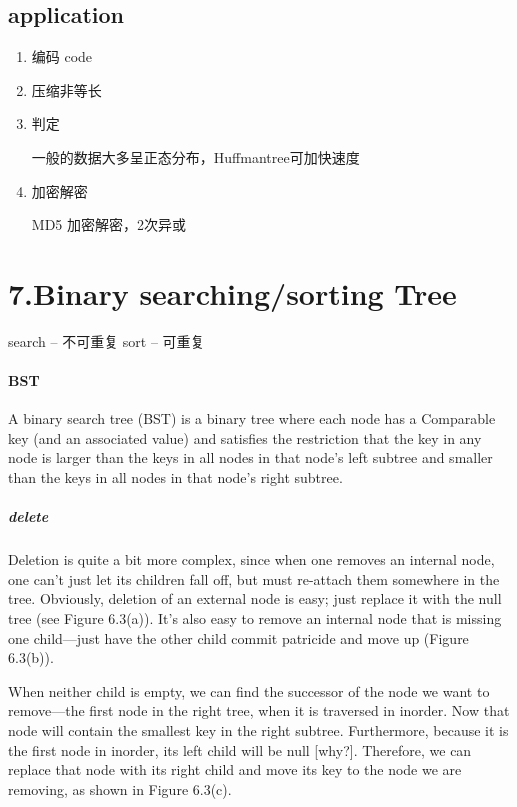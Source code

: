 \documentclass[UTF8]{ctexart}
\begin{document}
\subsection*{application}
\begin{enumerate}
\item 编码 code
\item 压缩非等长
\item 判定

一般的数据大多呈正态分布，Huffmantree可加快速度
\item 加密解密 

MD5 加密解密，2次异或
\end{enumerate}

\newpage
\section*{7.Binary searching/sorting Tree }
search -- 不可重复
sort -- 可重复
\paragraph{BST}
A binary search tree (BST) is a binary tree where each node has a Comparable key (and an associated value) 
and satisfies the restriction that the key in any node is 
larger than the keys in all nodes in that node's left subtree 
and smaller than the keys in all nodes in that node's right subtree.

\subparagraph{delete}
Deletion is quite a bit more complex, since when one removes an internal node, 
one can’t just let its children fall off, but must re-attach them somewhere in the tree. 
Obviously, deletion of an external node is easy; 
just replace it with the null tree (see Figure 6.3(a)). 
It’s also easy to remove an internal node that 
is missing one child—just have the other child commit patricide and move up (Figure 6.3(b)). 

When neither child is empty, we can find the successor of the node we want 
to remove—the first node in the right tree, when it is traversed in inorder. 
Now that node will contain the smallest key in the right subtree. 
Furthermore, because it is the first node in inorder, its left child will be null [why?]. 
Therefore, we can replace that node with its right child 
and move its key to the node we are removing, as shown in Figure 6.3(c).
\end{document}
